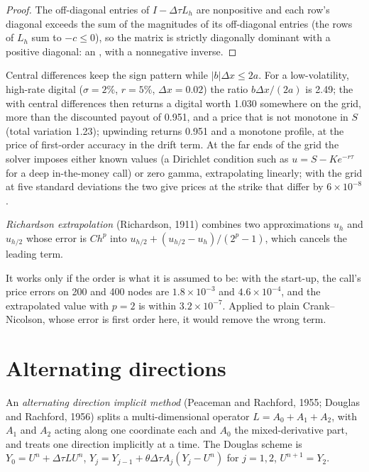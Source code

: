 \begin{proof}
The off-diagonal entries of $I - \Delta\tau L_h$ are nonpositive and each row's diagonal exceeds the sum of the magnitudes of its off-diagonal entries (the rows of $L_h$ sum to $-c \le 0$), so the matrix
is strictly diagonally dominant with a positive diagonal: an , with a nonnegative inverse.
\end{proof}

Central differences keep the sign pattern while $|b|\Delta x \le 2a$. For a low-volatility, high-rate digital ($\sigma = 2\%$, $r = 5\%$, $\Delta x = 0.02$) the ratio $b\Delta x/(2a)$ is 2.49; the  with central differences then returns a digital worth 1.030 somewhere on the grid, more than the discounted payout of 0.951, and a price that is not monotone in $S$ (total variation 1.23);
upwinding returns 0.951 and a monotone profile, at the price of first-order accuracy in the drift term. At the far ends of the grid the solver imposes either known values (a Dirichlet condition such as
$u = S - Ke^{-r\tau}$ for a deep in-the-money call) or zero gamma, extrapolating linearly; with the grid at five standard deviations the two give prices at the strike that differ by $6 \times 10^{-8}$.

\begin{definition}\label{def:qm:finite-difference-methods:rich}
\emph{Richardson extrapolation} (Richardson, 1911) combines two approximations $u_h$ and $u_{h/2}$ whose error is $Ch^p$ into $u_{h/2} + (u_{h/2} - u_h)/(2^p - 1)$, which
cancels the leading term.
\end{definition}

It works only if the order is what it is assumed to be: with the start-up, the call's price errors on 200 and 400 nodes are $1.8 \times 10^{-3}$ and $4.6 \times 10^{-4}$, and the extrapolated value with $p =
2$ is within $3.2 \times 10^{-7}$. Applied to plain Crank--Nicolson, whose error is first order here, it would remove the wrong term.

\section{Alternating directions}

\begin{definition}\label{def:qm:finite-difference-methods:adi}
An \emph{alternating direction implicit method} (Peaceman and Rachford, 1955; Douglas and Rachford, 1956) splits a multi-dimensional operator $L = A_0 + A_1 +
A_2$, with $A_1$ and $A_2$ acting along one coordinate each and $A_0$ the mixed-derivative part, and treats one direction implicitly at a time. The Douglas scheme is $Y_0 = U^n + \Delta\tau LU^n$, $Y_j =
Y_{j-1} + \theta\Delta\tau A_j(Y_j - U^n)$ for $j = 1, 2$, $U^{n+1} = Y_2$.
\end{definition}


